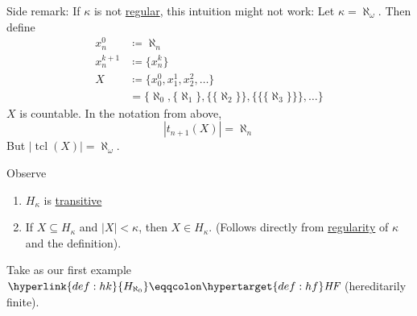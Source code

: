 \documentclass{article}
\newcommand{\hf}{\textit{HF}}
\newcommand{\1}{\mathbbm{1}}
\DeclareMathOperator{\tcl}{tcl}
\begin{document}
Side remark: If $\kappa$ is not \hyperlink{def:reg}{regular}, this intuition might not work: Let $\kappa = \aleph_\omega$. Then define
\begin{align*}
  x_n^0 &\coloneqq \aleph_n \\
  x_n^{k+1} &\coloneqq \{x_n^k\} \\
  X &\coloneqq \{x_0^0, x_1^1, x_2^2, \dotsc\} \\
    &= \{\aleph_0, \{\aleph_1\}, \{\{\aleph_2\}\}, \{\{\{\aleph_3\}\}\},\dotsc\}
\end{align*}
$X$ is countable. In the notation from above,
\begin{equation*}
  |t_{n+1}(X)| = \aleph_n
\end{equation*}
But $|\tcl(X)| = \aleph_\omega$.


Observe
\begin{enumerate}
  \item \hyperlink{def:hk}{$H_\kappa$} is \hyperlink{def:transitive}{transitive}
  \item If $X \subseteq H_\kappa$ and $|X| < \kappa$, then $X \in H_\kappa$. (Follows directly from \hyperlink{def:reg}{regularity} of $\kappa$ and the definition).
\end{enumerate}

Take as our first example $\hyperlink{def:hk}{H_{\aleph_0}} \eqqcolon \hypertarget{def:hf}\hf$ (hereditarily finite).
\end{document}
